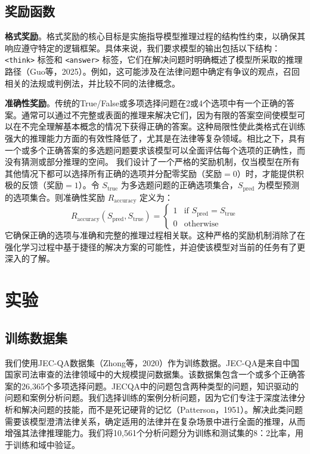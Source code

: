 \documentclass{pkuthesis}
\begin{document}
\subsection{奖励函数}
\textbf{格式奖励}。格式奖励的核心目标是实施指导模型推理过程的结构性约束，以确保其响应遵守特定的逻辑框架。具体来说，我们要求模型的输出包括以下结构：\texttt{<think>} 标签和 \texttt{<answer>} 标签，它们在解决问题时明确概述了模型所采取的推理路径（Guo等，2025）。例如，这可能涉及在法律问题中确定有争议的观点，召回相关的法规或判例法，并比较不同的法律概念。

\textbf{准确性奖励}。传统的True/False或多项选择问题在2或4个选项中有一个正确的答案。通常可以通过不完整或表面的推理来解决它们，因为有限的答案空间使模型可以在不完全理解基本概念的情况下获得正确的答案。这种局限性使此类格式在训练强大的推理能力方面的有效性降低了，尤其是在法律等复杂领域。相比之下，具有一个或多个正确答案的多选题问题要求该模型可以全面评估每个选项的正确性，而没有猜测或部分推理的空间。
我们设计了一个严格的奖励机制，仅当模型在所有其他情况下都可以选择所有正确的选项并分配零奖励（奖励$=0$）时，才能提供积极的反馈（奖励$=1$）。令 $S_{\text{true}}$ 为多选题问题的正确选项集合，$S_{\text{pred}}$ 为模型预测的选项集合。则准确性奖励 $R_{\text{accuracy}}$ 定义为：
$$ R_{\text{accuracy}}(S_{\text{pred}}, S_{\text{true}}) = \begin{cases} 1 & \text{if } S_{\text{pred}} = S_{\text{true}} \\ 0 & \text{otherwise} \end{cases} $$
它确保正确的选项与准确和完整的推理过程相关联。这种严格的奖励机制消除了在强化学习过程中基于捷径的解决方案的可能性，并迫使该模型对当前的任务有了更深入的了解。

\section{实验}
\subsection{训练数据集}
我们使用JEC-QA数据集（Zhong等，2020）作为训练数据。JEC-QA是来自中国国家司法审查的法律领域中的大规模提问数据集。该数据集包含一个或多个正确答案的26,365个多项选择问题。JECQA中的问题包含两种类型的问题，知识驱动的问题和案例分析问题。我们选择训练的案例分析问题，因为它们专注于深度法律分析和解决问题的技能，而不是死记硬背的记忆（Patterson，1951）。解决此类问题需要该模型澄清法律关系，确定适用的法律并在复杂场景中进行全面的推理，从而增强其法律推理能力。我们将10,561个分析问题分为训练和测试集的8：2比率，用于训练和域中验证。
\end{document}
